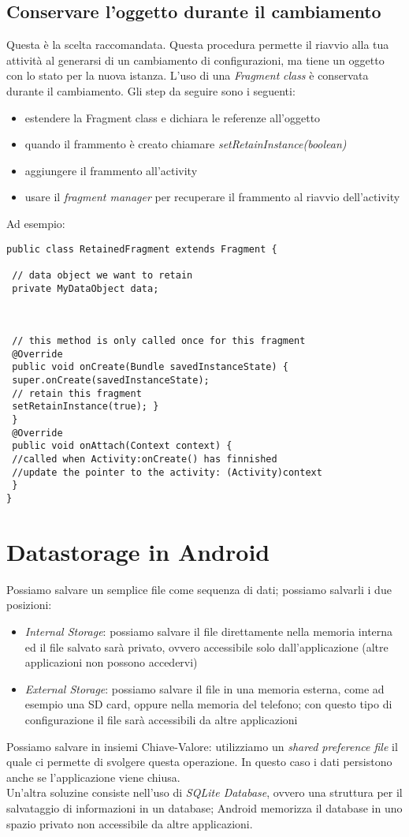 \subsection{Conservare l'oggetto durante il cambiamento}
Questa è la scelta raccomandata. Questa procedura permette il riavvio alla tua attività al generarsi di un cambiamento di configurazioni, ma tiene un oggetto con lo stato per la nuova istanza. L'uso di una \textit{Fragment} \textit{class} è conservata durante il cambiamento. Gli step da seguire sono i seguenti:
\begin{itemize}
    \item estendere la Fragment class e dichiara le referenze all'oggetto
    \item quando il frammento è creato chiamare \textit{setRetainInstance(boolean)}
    \item aggiungere il frammento all'activity
    \item usare il \textit{fragment manager} per recuperare il frammento al riavvio dell'activity
\end{itemize}
Ad esempio:
\begin{lstlisting}[frame=single]
public class RetainedFragment extends Fragment {

 // data object we want to retain
 private MyDataObject data;



 // this method is only called once for this fragment
 @Override
 public void onCreate(Bundle savedInstanceState) {
 super.onCreate(savedInstanceState);
 // retain this fragment
 setRetainInstance(true); }
 }
 @Override
 public void onAttach(Context context) {
 //called when Activity:onCreate() has finnished
 //update the pointer to the activity: (Activity)context
 }
}
\end{lstlisting}
\section{Datastorage in Android}
Possiamo salvare un semplice file come sequenza di dati; possiamo salvarli i due posizioni:
\begin{itemize}
    \item \textit{Internal Storage}: possiamo salvare il file direttamente nella memoria interna ed il file salvato sarà privato, ovvero accessibile solo dall'applicazione (altre applicazioni non possono accedervi)
    \item \textit{External Storage}: possiamo salvare il file in una memoria esterna, come ad esempio una SD card, oppure nella memoria del telefono; con questo tipo di configurazione il file sarà accessibili da altre applicazioni
\end{itemize}
Possiamo salvare in insiemi Chiave-Valore: utilizziamo un \textit{shared preference file} il quale ci permette di svolgere questa operazione. In questo caso i dati persistono anche se l'applicazione viene chiusa. \\
Un'altra soluzine consiste nell'uso di \textit{SQLite Database}, ovvero una struttura per il salvataggio di informazioni in un database; Android memorizza il database in uno spazio privato non accessibile da altre applicazioni.

